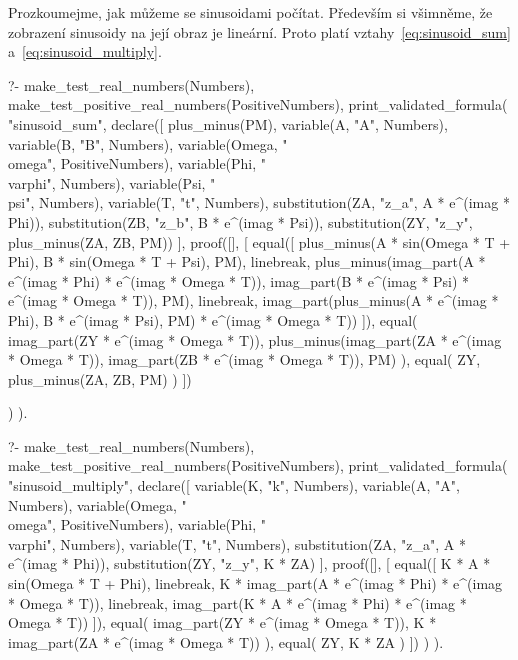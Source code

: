 Prozkoumejme, jak můžeme se sinusoidami počítat.
Především si všimněme, že zobrazení sinusoidy na její obraz je lineární. Proto platí vztahy~\eqref{eq:sinusoid_sum} a~\eqref{eq:sinusoid_multiply}.

\begin{prolog}
?-	make_test_real_numbers(Numbers),
	make_test_positive_real_numbers(PositiveNumbers),
	print_validated_formula(
		"sinusoid_sum",
		declare([
			plus_minus(PM),
			variable(A, "A", Numbers),
			variable(B, "B", Numbers),
			variable(Omega, "\\omega", PositiveNumbers),
			variable(Phi, "\\varphi", Numbers),
			variable(Psi, "\\psi", Numbers),
			variable(T, "t", Numbers),
			substitution(ZA, "z_a", A * e^(imag * Phi)),
			substitution(ZB, "z_b", B * e^(imag * Psi)),
			substitution(ZY, "z_y", plus_minus(ZA, ZB, PM))
		],
			proof([],
			[
				equal([
					plus_minus(A * sin(Omega * T + Phi), B * sin(Omega * T + Psi), PM),
					linebreak,
					plus_minus(imag_part(A * e^(imag * Phi) * e^(imag * Omega * T)), imag_part(B * e^(imag * Psi) * e^(imag * Omega * T)), PM),
					linebreak,
					imag_part(plus_minus(A * e^(imag * Phi), B * e^(imag * Psi), PM) * e^(imag * Omega * T))
				]),
				equal(
					imag_part(ZY * e^(imag * Omega * T)),
					plus_minus(imag_part(ZA * e^(imag * Omega * T)), imag_part(ZB * e^(imag * Omega * T)), PM)
				),
				equal(
					ZY,
					plus_minus(ZA, ZB, PM)
				)
			])
				
		)
	).
\end{prolog}

\begin{prolog}
?-	make_test_real_numbers(Numbers),
	make_test_positive_real_numbers(PositiveNumbers),
	print_validated_formula(
		"sinusoid_multiply",
		declare([
			variable(K, "k", Numbers),
			variable(A, "A", Numbers),
			variable(Omega, "\\omega", PositiveNumbers),
			variable(Phi, "\\varphi", Numbers),
			variable(T, "t", Numbers),
			substitution(ZA, "z_a", A * e^(imag * Phi)),
			substitution(ZY, "z_y", K * ZA)
		],
			proof([],
			[
				equal([
					K * A * sin(Omega * T + Phi),
					linebreak,
					K * imag_part(A * e^(imag * Phi) * e^(imag * Omega * T)),
					linebreak,
					imag_part(K * A * e^(imag * Phi) * e^(imag * Omega * T))
				]),
				equal(
					imag_part(ZY * e^(imag * Omega * T)),
					K * imag_part(ZA * e^(imag * Omega * T))
				),
				equal(
					ZY,
					K * ZA
				)
			])
		)
	).
\end{prolog}


